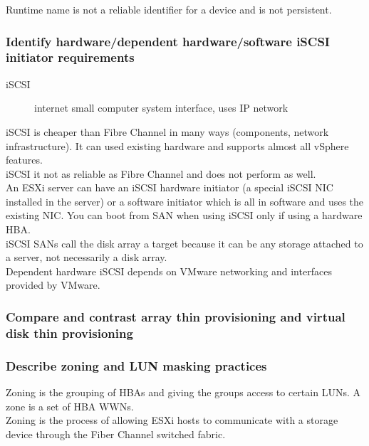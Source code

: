 Runtime name is not a reliable identifier for a device and is not persistent.

\subsubsection{Identify hardware/dependent hardware/software iSCSI initiator requirements}

\begin{description}
\item[iSCSI]
internet small computer system interface, uses IP network
\end{description}

iSCSI is cheaper than Fibre Channel in many ways (components, network
infrastructure). It can used existing hardware and supports almost all vSphere
features.\\

iSCSI it not as reliable as Fibre Channel and does not perform as well.\\

An ESXi server can have an iSCSI hardware initiator (a special iSCSI NIC
installed in the server) or a software initiator which is all in software and
uses the existing NIC. You can boot from SAN when using iSCSI only if using a
hardware HBA.\\

iSCSI SANs call the disk array a target because it can be any storage attached
to a server, not necessarily a disk array.\\

Dependent hardware iSCSI depends on VMware networking and interfaces provided
by VMware.

\subsubsection{Compare and contrast array thin provisioning and virtual disk thin provisioning}

\subsubsection{Describe zoning and LUN masking practices}

Zoning is the grouping of HBAs and giving the groups access to certain LUNs.
A zone is a set of HBA WWNs.\\

Zoning is the process of allowing ESXi hosts to communicate with a storage
device through the Fiber Channel switched fabric.\\

